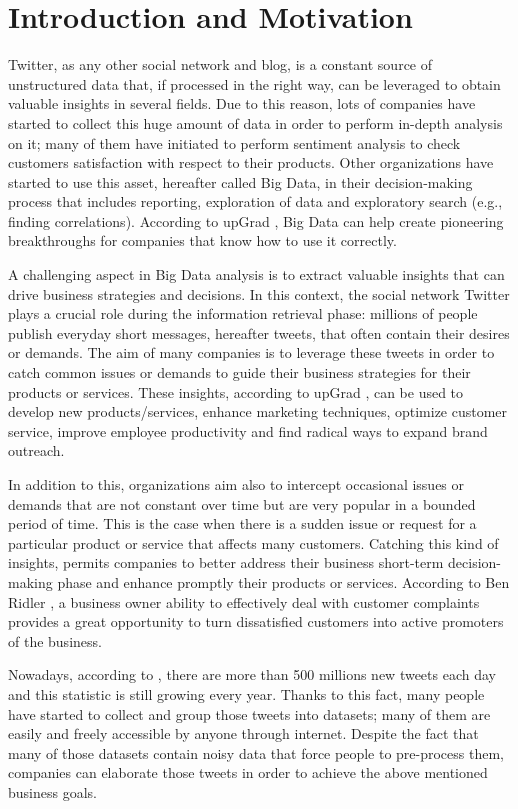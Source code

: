 \section{Introduction and Motivation}
\label{sec:introduction}
Twitter, as any other social network and blog, is a constant source of unstructured data that, if processed in the right way, can be leveraged to obtain valuable insights in several fields. Due to this reason, lots of companies have started to collect this huge amount of data in order to perform in-depth analysis on it; many of them have initiated to perform sentiment analysis to check customers satisfaction with respect to their products. Other organizations have started to use this asset, hereafter called Big Data, in their decision-making process that includes reporting, exploration of data and exploratory search (e.g., finding correlations). According to upGrad \cite{upGrad}, Big Data can help create pioneering breakthroughs for companies that know how to use it correctly.

A challenging aspect in Big Data analysis is to extract valuable insights that can drive business strategies and decisions. In this context, the social network Twitter plays a crucial role during the information retrieval phase: millions of people publish everyday short messages, hereafter tweets, that often contain their desires or demands. The aim of many companies is to leverage these tweets in order to catch common issues or demands to guide their business strategies for their products or services. These insights, according to upGrad \cite{upGrad}, can be used to develop new products/services, enhance marketing techniques, optimize customer service, improve employee productivity and find radical ways to expand brand outreach.

In addition to this, organizations aim also to intercept occasional issues or demands that are not constant over time but are very popular in a bounded period of time. This is the case when there is a sudden issue or request for a particular product or service that affects many customers. Catching this kind of insights, permits companies to better address their business short-term decision-making phase and enhance promptly their products or services. According to Ben Ridler \cite{customer-satistaction}, a business owner ability to effectively deal with customer complaints provides a great opportunity to turn dissatisfied customers into active promoters of the business.

Nowadays, according to \cite{twitter-stats}, there are more than 500 millions new tweets each day and this statistic is still growing every year. Thanks to this fact, many people have started to collect and group those tweets into datasets; many of them are easily and freely accessible by anyone through internet. Despite the fact that many of those datasets contain noisy data that force people to pre-process them, companies can elaborate those tweets in order to achieve the above mentioned business goals.


